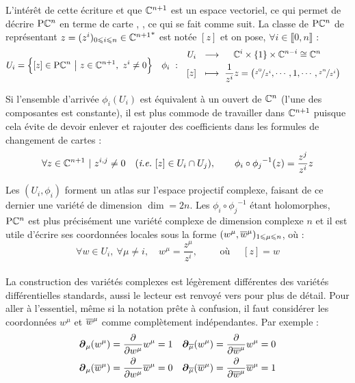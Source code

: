 L'intérêt de cette écriture et que $\mathbb{C}^{n+1}$ est un espace vectoriel, ce qui permet de décrire $\text{\normalfont P}\mathbb{C}^{n}$ en terme de carte \cite[lemme 2.17, p. 64]{lafontaine_introduction_2015}, \cite[chap. 2]{ballmann_lectures_2006}, ce qui se fait comme suit.
La classe de $\text{\normalfont P}\mathbb{C}^{n}$ de représentant $z = (z^i)_{0\leqslant i\leqslant n}\in{\mathbb{C}^{n+1}}^*$ est notée $[z]$ et on pose, $\forall i\in\llbracket0,n\rrbracket$ :
\begin{align}
	U_i &= \Big\{[z]\in\text{\normalfont P}\mathbb{C}^{n}\ \big|\ z\in \mathbb{C}^{n+1},\ z^i\neq 0\Big\}  &  \phi_i\  :\quad &\begin{aligned}
		U_i\ \ &\longrightarrow\quad\ \mathbb{C}^{i}\times \{1\} \times\mathbb{C}^{n-i}\cong \mathbb{C}^{n} \\ [z]\ \ &\longmapsto\ \frac{1}{z^i}z = \big(\nicefrac{z^0}{z^i},\cdots, 1, \cdots, \nicefrac{z^n}{z^i}\big)
	\end{aligned}
\end{align}
\begin{remarque}
	Si l'ensemble d'arrivée $\phi_i(U_i)$ est équivalent à un ouvert de $\mathbb{C}^{n}$ (l'une des composantes est constante), il est plus commode de travailler dans $\mathbb{C}^{n+1}$ puisque cela évite de devoir enlever et rajouter des coefficients dans les formules de changement de cartes :
	\[ \forall z\in\mathbb{C}^{n+1}\ |\ z^{i,j}\neq 0\quad (\textit{i.e.}~[z]\in U_i\cap U_j) ,\qquad \phi_i \circ {\phi_j}^{-1}(z) = \frac{z^j}{z^i}z\]
\end{remarque}
\skipl
Les $(U_i,\phi_i)$ forment un atlas sur l'espace projectif complexe, faisant de ce dernier une variété de dimension $\dim = 2n$. Les $\phi_i \circ {\phi_j}^{-1}$ étant holomorphes, $\text{\normalfont P}\mathbb{C}^{n}$ est plus précisément une variété complexe de dimension complexe $n$ et il est utile d'écrire ses coordonnées locales sous la forme $(w^\mu, \overline{w}^\mu)_{1\leqslant \mu \leqslant n}$, où :
\[\forall w\in U_i,\ \forall \mu\neq i,\quad w^\mu = \frac{z^\mu}{z^i},\qquad  \text{ où }\quad [z] = w\]
\\
La construction des variétés complexes est légèrement différentes des variétés différentielles standards, aussi le lecteur est renvoyé vers \cite{nakahara_geometry_2003,ballmann_lectures_2006,huybrechts_complex_2005} pour plus de détail. Pour aller à l'essentiel, même si la notation prête à confusion, il faut considérer les coordonnées $w^\mu$ et $\overline{w}^\mu$ comme complètement indépendantes.
Par exemple :
\begin{align*}
	\boldsymbol{\partial}_\mu(w^\mu) &= \frac{\partial}{\partial w^\mu} w^\mu = 1  &  
	\boldsymbol{\partial}_{\overline{\mu}}(w^\mu) = \frac{\partial}{\partial \overline{w}^\mu} w^\mu &= 0 
	\\
	\boldsymbol{\partial}_\mu(\overline{w}^\mu) &= \frac{\partial}{\partial w^\mu} \overline{w}^\mu = 0  &  
	\boldsymbol{\partial}_{\overline{\mu}}(\overline{w}^\mu) = \frac{\partial}{\partial \overline{w}^\mu} \overline{w}^\mu &= 1
\end{align*}
